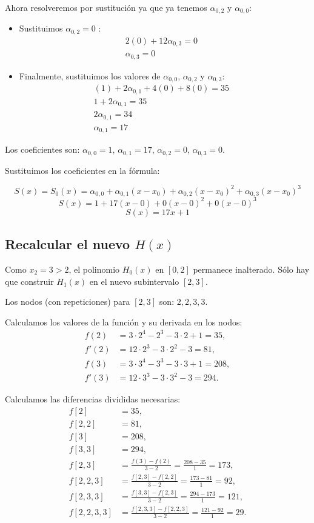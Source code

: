 \documentclass{article}
\begin{document}
Ahora resolveremos por sustitución ya que ya tenemos \(\alpha_{0,2}\) y \(\alpha_{0,0}\):
\begin{itemize}
    \item Sustituimos \(\alpha_{0,2}=0\) :
    \begin{align*}
    &2(0) + 12\alpha_{0,3} = 0 &&\\
    &\alpha_{0,3} = 0 &&
    \end{align*}
    \item Finalmente, sustituimos los valores de \(\alpha_{0,0}\), \(\alpha_{0,2}\) y \(\alpha_{0,3}\):
    \begin{align*}
    &(1) + 2\alpha_{0,1} + 4(0) + 8(0) = 35 &&\\
    &1 + 2\alpha_{0,1} = 35 &&\\
    &2\alpha_{0,1} = 34 &&\\
    &\alpha_{0,1} = 17 &&
    \end{align*}
\end{itemize}
Los coeficientes son: \(\alpha_{0,0} = 1\), \(\alpha_{0,1} = 17\), \(\alpha_{0,2} = 0\), \(\alpha_{0,3} = 0\).

Sustituimos los coeficientes en la fórmula:

$$ S(x) = S_0(x) = \alpha_{0,0} + \alpha_{0,1}(x-x_0) + \alpha_{0,2}(x-x_0)^2 + \alpha_{0,3}(x-x_0)^3 $$
$$ S(x) = 1 + 17(x-0) + 0(x-0)^2 + 0(x-0)^3 $$
$$ \boxed{S(x) = 17x + 1} $$


\subsection{Recalcular el nuevo $H(x)$}

Como $x_2=3>2$, el polinomio $H_0(x)$ en $[0,2]$ permanece inalterado. Sólo hay que construir $H_1(x)$ en el nuevo subintervalo $[2,3]$.

Los nodos (con repeticiones) para $[2,3]$ son: $2,2,3,3$.

Calculamos los valores de la función y su derivada en los nodos:
\begin{align*}
f(2) &= 3\cdot2^4 - 2^3 - 3\cdot2 + 1 = 35, \\
f'(2) &= 12\cdot2^3 - 3\cdot2^2 - 3 = 81, \\
f(3) &= 3\cdot3^4 - 3^3 - 3\cdot3 + 1 = 208, \\
f'(3) &= 12\cdot3^3 - 3\cdot3^2 - 3 = 294.
\end{align*}

Calculamos las diferencias divididas necesarias:
\begin{align*}
f[2] &= 35, \\
f[2,2] &= 81, \\
f[3] &= 208, \\
f[3,3] &= 294, \\
f[2,3] &= \frac{f(3) - f(2)}{3-2} = \frac{208 - 35}{1} = 173, \\
f[2,2,3] &= \frac{f[2,3] - f[2,2]}{3-2} = \frac{173 - 81}{1} = 92, \\
f[2,3,3] &= \frac{f[3,3] - f[2,3]}{3-2} = \frac{294 - 173}{1} = 121, \\
f[2,2,3,3] &= \frac{f[2,3,3] - f[2,2,3]}{3-2} = \frac{121 - 92}{1} = 29.
\end{align*}
\end{document}
